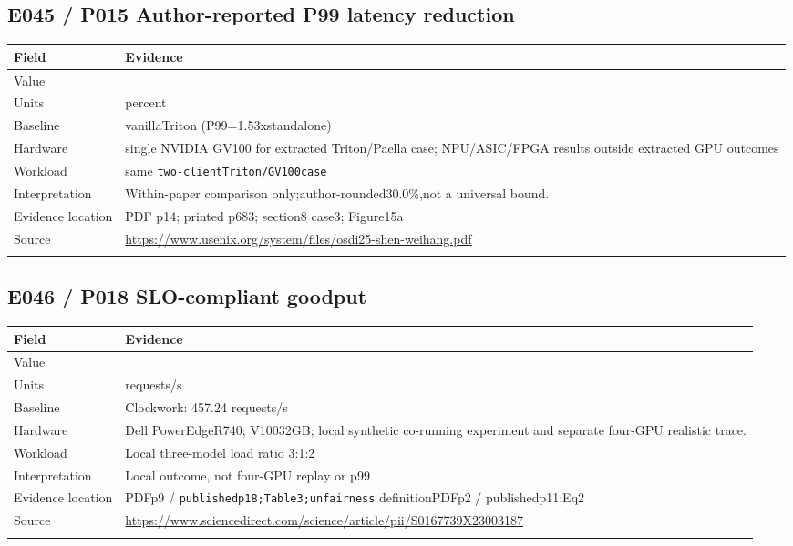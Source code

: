 \subsection*{E045 / P015 Author-reported P99 latency reduction}

\begin{longtable}{>{\raggedright\arraybackslash}p{}>{\raggedright\arraybackslash}p{}}
\toprule
\textbf{Field} & \textbf{Evidence}\\\midrule\endhead
Value & 30.0\\\addlinespace
Units & percent\\\addlinespace
Baseline & vanillaTriton (P99=1.53xstandalone)\\\addlinespace
Hardware & single NVIDIA GV100 for extracted Triton/Paella case; NPU/ASIC/FPGA results outside extracted GPU outcomes\\\addlinespace
Workload & same \nolinkurl{two-clientTriton/GV100case}\\\addlinespace
Interpretation & Within-paper comparison only;author-rounded30.0\%,not a universal bound.\\\addlinespace
Evidence location & PDF p14; printed p683; section8 case3; Figure15a\\\addlinespace
Source & \url{https://www.usenix.org/system/files/osdi25-shen-weihang.pdf}\\\addlinespace
\bottomrule\end{longtable}

\subsection*{E046 / P018 SLO-compliant goodput}

\begin{longtable}{>{\raggedright\arraybackslash}p{}>{\raggedright\arraybackslash}p{}}
\toprule
\textbf{Field} & \textbf{Evidence}\\\midrule\endhead
Value & 524.29\\\addlinespace
Units & requests/s\\\addlinespace
Baseline & Clockwork: 457.24 requests/s\\\addlinespace
Hardware & Dell PowerEdgeR740; V10032GB; local synthetic co-running experiment and separate four-GPU realistic trace.\\\addlinespace
Workload & Local three-model load ratio 3:1:2\\\addlinespace
Interpretation & Local outcome, not four-GPU replay or p99\\\addlinespace
Evidence location & PDFp9 / \nolinkurl{publishedp18;Table3;unfairness} definitionPDFp2 / publishedp11;Eq2\\\addlinespace
Source & \url{https://www.sciencedirect.com/science/article/pii/S0167739X23003187}\\\addlinespace
\bottomrule\end{longtable}

